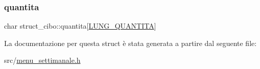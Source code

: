 \mbox{\label{structstruct__cibo_a32ea9e1a1f09a5f23de656236b0f9616}} 
\subsubsection{\texorpdfstring{quantita}{quantita}}
{\footnotesize\ttfamily char struct\+\_\+cibo\+::quantita\mbox{[}\hyperlink{menu__settimanale_8h_af69c340c57cfdd29bd5cec6848afbf16}{L\+U\+N\+G\+\_\+\+Q\+U\+A\+N\+T\+I\+TA}\mbox{]}}



La documentazione per questa struct è stata generata a partire dal seguente file\+:\begin{DoxyCompactItemize}
\item 
src/\hyperlink{menu__settimanale_8h}{menu\+\_\+settimanale.\+h}\end{DoxyCompactItemize}
